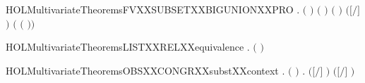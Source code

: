 \begin{SaveVerbatim}{HOLMultivariateTheoremsFVXXSUBSETXXBIGUNIONXXPRO}
\HOLTokenTurnstile{} \HOLSymConst{\HOLTokenForall{}}  .
         \HOLSymConst{\HOLTokenConj{}} \ensuremath{(}  \HOLSymConst{\ensuremath{=}}  \ensuremath{)} \HOLSymConst{\HOLTokenConj{}}
        \ensuremath{(} \ensuremath{)} \ensuremath{(} \ensuremath{)} \HOLSymConst{\HOLTokenImp{}}
        \ensuremath{(}\ensuremath{[}\ensuremath{/}\ensuremath{]} \ensuremath{)} \HOLConst{\HOLTokenSubset{}}
            \HOLConst{\HOLTokenUnion{}}  \ensuremath{(}  \ensuremath{(} \ensuremath{)}\ensuremath{)}
\end{SaveVerbatim}
\newcommand{\HOLMultivariateTheoremsFVXXSUBSETXXBIGUNIONXXPRO}{\UseVerbatim{HOLMultivariateTheoremsFVXXSUBSETXXBIGUNIONXXPRO}}
\begin{SaveVerbatim}{HOLMultivariateTheoremsLISTXXRELXXequivalence}
\HOLTokenTurnstile{} \HOLSymConst{\HOLTokenForall{}}.   \HOLSymConst{\HOLTokenImp{}}  \ensuremath{(} \ensuremath{)}
\end{SaveVerbatim}
\newcommand{\HOLMultivariateTheoremsLISTXXRELXXequivalence}{\UseVerbatim{HOLMultivariateTheoremsLISTXXRELXXequivalence}}
\begin{SaveVerbatim}{HOLMultivariateTheoremsOBSXXCONGRXXsubstXXcontext}
\HOLTokenTurnstile{} \HOLSymConst{\HOLTokenForall{}}  .
         \HOLSymConst{\HOLTokenConj{}} \ensuremath{(}  \HOLSymConst{\ensuremath{=}}  \ensuremath{)} \HOLSymConst{\HOLTokenConj{}}
          \HOLSymConst{\HOLTokenImp{}}
       \HOLSymConst{\HOLTokenForall{}}.    \HOLSymConst{\HOLTokenImp{}}  \ensuremath{(}\ensuremath{[}\ensuremath{/}\ensuremath{]} \ensuremath{)} \ensuremath{(}\ensuremath{[}\ensuremath{/}\ensuremath{]} \ensuremath{)}
\end{SaveVerbatim}
